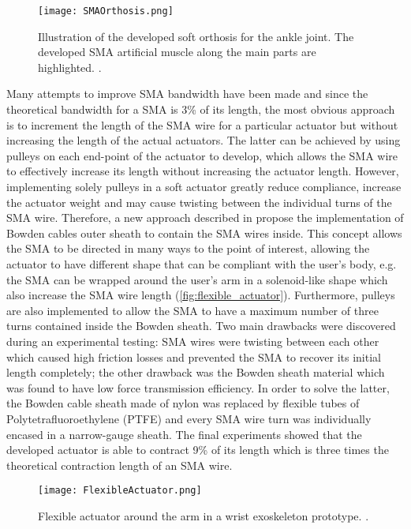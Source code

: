 \begin{figure}[hbtp!]
    \centering
    \texttt{[image: SMAOrthosis.png]}
    \caption{Illustration of the developed soft orthosis for the ankle joint. The developed SMA artificial muscle along the main parts are highlighted. \cite{Zhang2013a}. }
    \label{fig:SMA_orthosis}
\end{figure}

Many attempts to improve SMA bandwidth have been made and since the theoretical bandwidth for a SMA is 3\% of its length, the most obvious approach is to increment the length of the SMA wire for a particular actuator but without increasing the length of the actual actuators. The latter can be achieved by using pulleys on each end-point of the actuator to develop, which allows the SMA wire to effectively increase its length without increasing the actuator length. However, implementing solely pulleys in a soft actuator greatly reduce compliance, increase the actuator weight and may cause twisting between the individual turns of the SMA wire. Therefore, a new approach described in \cite{Villoslada2015} propose the implementation of Bowden cables outer sheath to contain the SMA wires inside. This concept allows the SMA to be directed in many ways to the point of interest, allowing the actuator to have different shape that can be compliant with the user's body, e.g. the SMA can be wrapped around the user's arm in a solenoid-like shape which also increase the SMA wire length (\autoref{fig:flexible_actuator}). Furthermore, pulleys are also implemented to allow the SMA to have a maximum number of three turns contained inside the Bowden sheath. Two main drawbacks were discovered during an experimental testing: SMA wires were twisting between each other which caused high friction losses and prevented the SMA to recover its initial length completely; the other drawback was the Bowden sheath material which was found to have low force transmission efficiency. In order to solve the latter, the Bowden cable sheath made of nylon was replaced by flexible tubes of Polytetrafluoroethylene (PTFE) and every SMA wire turn was individually encased in a narrow-gauge sheath. The final experiments showed that the developed actuator is able to contract 9\% of its length which is three times the theoretical contraction length of an SMA wire.

\begin{figure}[hbtp!]
    \centering
    \texttt{[image: FlexibleActuator.png]}
    \caption{Flexible actuator around the arm in a wrist exoskeleton prototype. \cite{Villoslada2015}. }
    \label{fig:flexible_actuator}
\end{figure}

